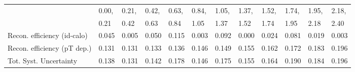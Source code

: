 \begin{tabular}{l|p{0.6cm}p{0.6cm}p{0.6cm}p{0.6cm}p{0.6cm}p{0.6cm}p{0.6cm}p{0.6cm}p{0.6cm}p{0.6cm}p{0.6cm}}
\hline
   & 0.00, & 0.21, & 0.42, & 0.63, & 0.84, & 1.05, & 1.37, & 1.52, & 1.74, & 1.95, & 2.18,  \\ 
   & 0.21 & 0.42 & 0.63 & 0.84 & 1.05 & 1.37 & 1.52 & 1.74 & 1.95 & 2.18 & 2.40  \\ 
\hline
Recon. efficiency (id-calo)              & 0.045 & 0.005 & 0.050 & 0.115 & 0.003 & 0.092 & 0.000 & 0.024 & 0.081 & 0.019 & 0.003 \\
\hline
Recon. efficiency (pT dep.)              & 0.131 & 0.131 & 0.133 & 0.136 & 0.146 & 0.149 & 0.155 & 0.162 & 0.172 & 0.183 & 0.196 \\
\hline
Tot. Syst. Uncertainty                   & 0.138 & 0.131 & 0.142 & 0.178 & 0.146 & 0.175 & 0.155 & 0.164 & 0.190 & 0.184 & 0.196 \\
\hline
\end{tabular}
